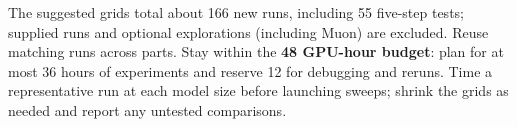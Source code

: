 The suggested grids total about 166 new runs, including 55 five-step tests;
supplied runs and optional explorations (including Muon) are excluded.
Reuse matching runs across parts. Stay within the \textbf{48 GPU-hour budget}:
plan for at most 36 hours of experiments and reserve 12 for debugging and reruns.
Time a representative run at each model size before launching sweeps; shrink
the grids as needed and report any untested comparisons.
